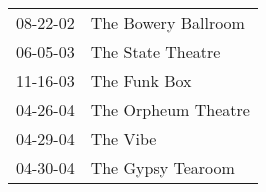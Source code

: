 \begin{supertabular}{p{0.25\columnwidth}p{0.75\columnwidth}}
 08-22-02 &  The Bowery Ballroom \\
 06-05-03 &    The State Theatre \\
 11-16-03 &         The Funk Box \\
 04-26-04 &  The Orpheum Theatre \\
 04-29-04 &             The Vibe \\
 04-30-04 &    The Gypsy Tearoom \\
\end{supertabular}
